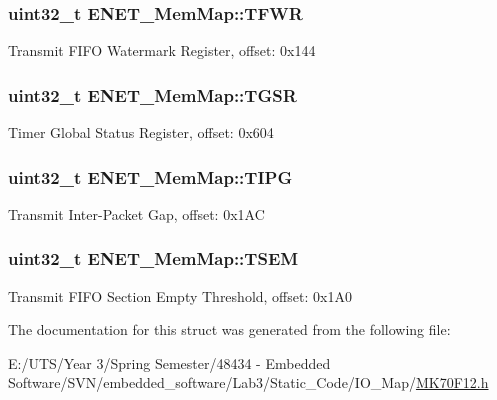 \subsubsection[{T\+F\+W\+R}]{\setlength{\rightskip}{0pt plus 5cm}uint32\+\_\+t E\+N\+E\+T\+\_\+\+Mem\+Map\+::\+T\+F\+W\+R}\label{struct_e_n_e_t___mem_map_aef8b194a94a2a24c0f705e65af5bee24}
Transmit F\+I\+F\+O Watermark Register, offset\+: 0x144 \hypertarget{struct_e_n_e_t___mem_map_af759f85ad62d7a7d8937391b0eb9f4d4}{}
\subsubsection[{T\+G\+S\+R}]{\setlength{\rightskip}{0pt plus 5cm}uint32\+\_\+t E\+N\+E\+T\+\_\+\+Mem\+Map\+::\+T\+G\+S\+R}\label{struct_e_n_e_t___mem_map_af759f85ad62d7a7d8937391b0eb9f4d4}
Timer Global Status Register, offset\+: 0x604 \hypertarget{struct_e_n_e_t___mem_map_a33c2b64aa493e8e381cd207ac9c6e8ec}{}
\subsubsection[{T\+I\+P\+G}]{\setlength{\rightskip}{0pt plus 5cm}uint32\+\_\+t E\+N\+E\+T\+\_\+\+Mem\+Map\+::\+T\+I\+P\+G}\label{struct_e_n_e_t___mem_map_a33c2b64aa493e8e381cd207ac9c6e8ec}
Transmit Inter-\/\+Packet Gap, offset\+: 0x1\+A\+C \hypertarget{struct_e_n_e_t___mem_map_a8cb50de4da08a100de4f82ddc5f4eb9e}{}
\subsubsection[{T\+S\+E\+M}]{\setlength{\rightskip}{0pt plus 5cm}uint32\+\_\+t E\+N\+E\+T\+\_\+\+Mem\+Map\+::\+T\+S\+E\+M}\label{struct_e_n_e_t___mem_map_a8cb50de4da08a100de4f82ddc5f4eb9e}
Transmit F\+I\+F\+O Section Empty Threshold, offset\+: 0x1\+A0 

The documentation for this struct was generated from the following file\+:\begin{DoxyCompactItemize}
\item 
E\+:/\+U\+T\+S/\+Year 3/\+Spring Semester/48434 -\/ Embedded Software/\+S\+V\+N/embedded\+\_\+software/\+Lab3/\+Static\+\_\+\+Code/\+I\+O\+\_\+\+Map/\hyperlink{_m_k70_f12_8h}{M\+K70\+F12.\+h}\end{DoxyCompactItemize}
